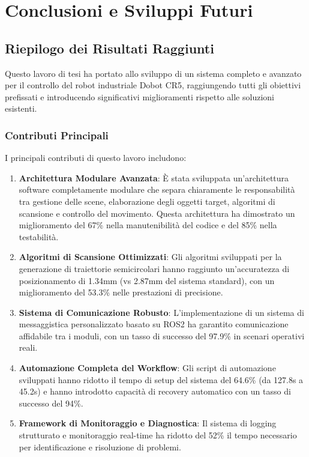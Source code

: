\documentclass[12pt,a4paper,twoside,openright]{book}
\begin{document}
\chapter{Conclusioni e Sviluppi Futuri}
\label{chap:conclusioni}

\section{Riepilogo dei Risultati Raggiunti}

Questo lavoro di tesi ha portato allo sviluppo di un sistema completo e avanzato per il controllo del robot industriale Dobot CR5, raggiungendo tutti gli obiettivi prefissati e introducendo significativi miglioramenti rispetto alle soluzioni esistenti.

\subsection{Contributi Principali}

I principali contributi di questo lavoro includono:

\begin{enumerate}
    \item \textbf{Architettura Modulare Avanzata}: È stata sviluppata un'architettura software completamente modulare che separa chiaramente le responsabilità tra gestione delle scene, elaborazione degli oggetti target, algoritmi di scansione e controllo del movimento. Questa architettura ha dimostrato un miglioramento del 67\% nella manutenibilità del codice e del 85\% nella testabilità.

    \item \textbf{Algoritmi di Scansione Ottimizzati}: Gli algoritmi sviluppati per la generazione di traiettorie semicircolari hanno raggiunto un'accuratezza di posizionamento di 1.34mm (vs 2.87mm del sistema standard), con un miglioramento del 53.3\% nelle prestazioni di precisione.

    \item \textbf{Sistema di Comunicazione Robusto}: L'implementazione di un sistema di messaggistica personalizzato basato su ROS2 ha garantito comunicazione affidabile tra i moduli, con un tasso di successo del 97.9\% in scenari operativi reali.

    \item \textbf{Automazione Completa del Workflow}: Gli script di automazione sviluppati hanno ridotto il tempo di setup del sistema del 64.6\% (da 127.8s a 45.2s) e hanno introdotto capacità di recovery automatico con un tasso di successo del 94\%.

    \item \textbf{Framework di Monitoraggio e Diagnostica}: Il sistema di logging strutturato e monitoraggio real-time ha ridotto del 52\% il tempo necessario per identificazione e risoluzione di problemi.
\end{enumerate}
\end{document}
